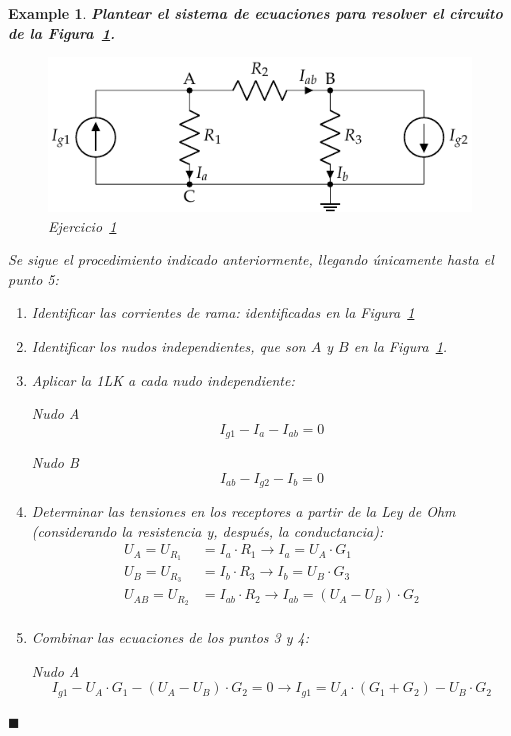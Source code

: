 \documentclass[11pt]{book} %
\numberwithin{dummy}{section}
\theoremstyle{ocrenumbox}
\theoremstyle{blacknumex}
\newtheorem{exampleT}{Example}[chapter]
\theoremstyle{blacknumbox}
\theoremstyle{ocrenum}
\newenvironment{example}{\begin{exampleT}}{\hfill{\tiny\ensuremath{\blacksquare}}\end{exampleT}}
\newlength\esp
\begin{document}
	\vspace{4mm}
	\begin{example}\label{ej.1-6}
		\textbf{Plantear el sistema de ecuaciones para resolver el circuito de la Figura~\ref{fig.nudos}.}
		\begin{figure}[htbp]
			\centering
			\includegraphics[width=0.6\linewidth]{../figs/nudos.pdf}
			\caption{Ejercicio~\ref{ej.1-6}}
			\label{fig.nudos}
		\end{figure}
		
		Se sigue el procedimiento indicado anteriormente, llegando únicamente hasta el punto 5: 
		
		\begin{enumerate}
			\item Identificar las corrientes de rama: identificadas en la Figura~\ref{fig.nudos}
			\item Identificar los nudos independientes, que son $A$ y $B$ en la Figura~\ref{fig.nudos}.
			\item Aplicar la 1LK a cada nudo independiente:
			
			Nudo A
			\begin{equation*}
				I_{g1} - I_a - I_{ab} = 0
			\end{equation*}
			
			Nudo B
			\begin{equation*}
				I_{ab} - I_{g2} - I_b = 0
			\end{equation*}
			\item Determinar las tensiones en los receptores a partir de la Ley de Ohm (considerando la resistencia y, después, la conductancia):
			\begin{align*}
				U_A = U_{R_1} &= I_a \cdot R_1\rightarrow I_a=U_A\cdot G_1\\
				U_B = U_{R_3} &= I_b \cdot R_3\rightarrow I_b=U_B\cdot G_3\\
				U_{AB}=U_{R_2} &= I_{ab} \cdot R_2\rightarrow I_{ab}=(U_A-U_B)\cdot G_2\\
			\end{align*}
			\item Combinar las ecuaciones de los puntos 3 y 4:
			
			Nudo A
			\begin{equation*}
				I_{g1} - U_A \cdot G_1 - (U_A - U_B) \cdot G_2 = 0\rightarrow I_{g1} = U_A \cdot (G_1 + G_2) - U_B \cdot G_2 
			\end{equation*}
			

\end{enumerate}
\end{example}
\end{document}
